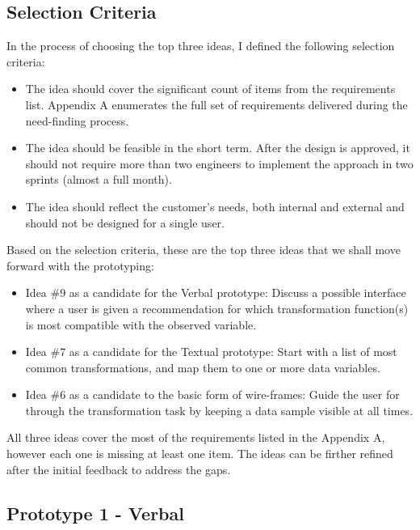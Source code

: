 \documentclass[12pt,letterpaper]{article}
\begin{document}
\subsection*{Selection Criteria}
In the process of choosing the top three ideas, I defined the following selection criteria:

\begin{itemize}
    \item The idea should cover the significant count of items from the requirements list. Appendix A enumerates the full set of requirements delivered during the need-finding process.
    \item The idea should be feasible in the short term. After the design is approved, it should not require more than two engineers to implement the approach in two sprints (almost a full month).
    \item The idea should reflect the customer's needs, both internal and external and should not be designed for a single user. 
\end{itemize}

Based on the selection criteria, these are the top three ideas that we shall move forward with the prototyping:

\begin{itemize}
    \item Idea \#9 as a candidate for the Verbal prototype: Discuss a possible interface where a user is given a recommendation for which transformation function(s) is most compatible with the observed variable.
    
    \item Idea \#7 as a candidate for the Textual prototype: Start with a list of most common transformations, and map them to one or more data variables.

    \item Idea \#6 as a candidate to the basic form of wire-frames: Guide the user for through the transformation task by keeping a data sample visible at all times.  
\end{itemize}

All three ideas cover the most of the requirements listed in the Appendix A, however each one is missing at least one item. The ideas can be firther refined after the initial feedback to address the gaps.


\subsection*{Prototype 1 - Verbal}
\end{document}
